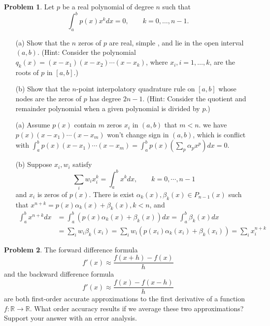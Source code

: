 \documentclass[a4paper]{book}
\makeatletter
\newenvironment{sol}[1][\solname]{\par
  \pushQED{\qed}
  \normalfont \topsep6\p@\@plus6\p@\relax
  \trivlist
  \item[\hskip\labelsep
        \itshape
    #1\@addpunct{.}]\ignorespaces
}{\popQED\endtrivlist\@endpefalse}
\providecommand{\solname}{Solution}
\numberwithin{equation}{chapter}
\theoremstyle{definition}
\newtheorem{pro}{Problem}
\makeatother
\begin{document}
\begin{pro}
    Let $p$ be a real polynomial of degree $n$ such that 
    \[ \int_a^b p(x) x^k dx = 0, \qquad k = 0, \ldots, n-1.\]
    \begin{itemize}
        \item [(a)] Show that the $n$ zeros of $p$ are real, simple
        , and lie in the open interval $(a, b)$. (Hint: Consider 
        the polynomial $q_k(x) = (x - x_1)(x - x_2)\cdots (x - x_k)$, 
        where $x_i, i = 1,\ldots, k$, are the roots of $p$ in 
        $[a, b]$.)

        \item [(b)] Show that the $n$-point interpolatory quadrature rule 
        on $[a, b]$ whose nodes are the zeros of $p$ has degree 
        $2n - 1$. (Hint: Consider the quotient and remainder polynomial
        when a given polynomial is divided by $p$.)
    \end{itemize}
\end{pro}
\begin{sol}
    \begin{itemize}
        \item [(a)] Assume $p(x)$ contain $m$ zeros $x_i$ in $(a, b)$ that $m < n$. we have 
        $p(x)(x - x_1)\cdots (x - x_m)$ won't change sign in $(a, b)$, which is 
        conflict with $
            \int_a^bp(x)(x - x_1)\cdots(x - x_m) = \int_a^b p(x) (\sum_p \alpha_p x^p) dx = 0$.

            \item [(b)] Suppose $x_i, w_i$ satisfy 
            \[\sum_i w_i x_i^k = \int_a^b x^k dx, \qquad k = 0,\cdots, n -1\]
            and $x_i$ is zeros of $p(x)$. There is exist $\alpha_k(x), \beta_k(x) \in P_{n-1}(x)$ 
            such that $x^{n +k} = p(x)\alpha_k(x) + \beta_k(x), k < n$, and 
            \begin{align*}
                \int_a^b x^{n + k} dx &= \int_a^b(p(x) \alpha_k(x) + \beta_k(x))dx 
                 = \int_a^b \beta_k(x) dx 
                 \\ &= \sum_i w_i \beta_k(x_i) 
                =\sum_i w_i(p(x_i) \alpha_k(x_i) + \beta_k(x_i)) = \sum_i x_i^{n + k}
            \end{align*}
    \end{itemize}
\end{sol}
\begin{pro}
    The forward difference formula 
    \[ f'(x) \approx \frac{f(x +h ) - f(x)}{h}\]
    and the backward difference formula 
    \[f'(x) \approx \frac{f(x) - f(x -h)}{h}\]
    are both first-order accurate approximations to 
    the first derivative of a function $f: \mathbb{R} \rightarrow 
    \mathbb{R}$. What order accuracy results if we average these 
    two approximations? Support your answer with an error analysis.
\end{pro}
\end{document}

